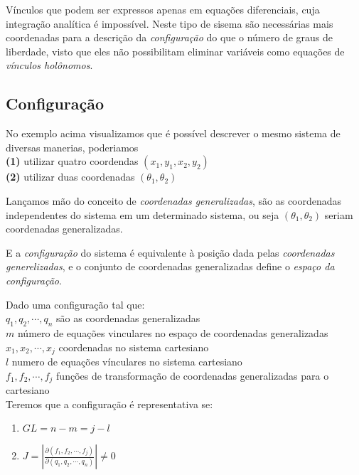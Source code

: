 \begin{namedtheorem}
  Vínculos que podem ser expressos apenas em equações diferenciais, cuja integração analítica é impossível.
  Neste tipo de sisema são necessárias mais coordenadas para a descrição da \textit{configuração} do que o número de graus de liberdade, visto que eles não possibilitam eliminar variáveis como equações de \textit{vínculos holônomos}.
\end{namedtheorem}

\subsection{Configuração}

No exemplo acima visualizamos que é possível descrever o mesmo sistema de diversas manerias, poderiamos \\\textbf{(1)} utilizar quatro coordendas $(x_1, y_1, x_2, y_2)$ \\\textbf{(2)} utilizar duas coordenadas $(\theta_1, \theta_2)$

Lançamos mão do conceito de \textit{coordenadas generalizadas}, são as coordenadas independentes do sistema em um determinado sistema, ou seja $(\theta_1, \theta_2)$ seriam coordenadas generalizadas.

E a \textit{configuração} do sistema é equivalente à posição dada pelas \textit{coordenadas generelizadas}, e o conjunto de coordenadas generalizadas define o \textit{espaço da configuração}.

\begin{namedtheorem}
Dado uma configuração tal que: \\
$q_1, q_2, \cdots, q_n$ são as coordenadas generalizadas\\
$m$ número de equações vinculares no espaço de coordenadas generalizadas\\
$x_1, x_2, \cdots, x_j$ coordenadas no sistema cartesiano\\
$l$ numero de equações vínculares no sistema cartesiano \\
$f_1, f_2, \cdots, f_j$ funções de transformação de coordenadas generalizadas para o cartesiano\\

Teremos que a configuração é representativa se:

\begin{enumerate}
	\item $GL = n - m = j - l$
	\item $J = |\frac{\partial (f_1, f_2, \cdots, f_j)}{\partial (q_1, q_2, \cdots, q_n)}| \neq 0$
\end{enumerate}

\end{namedtheorem}












